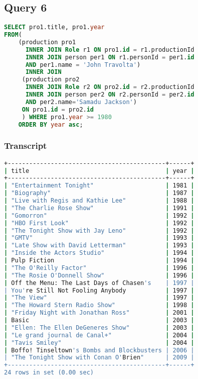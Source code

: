 \subsection{Query 6}
\begin{lstlisting}[language=sql]
SELECT pro1.title, pro1.year
FROM(
	(production pro1
	  INNER JOIN Role r1 ON pro1.id = r1.productionId
	  INNER JOIN person per1 ON r1.personId = per1.id
	  AND per1.name = 'John Travolta')
	  INNER JOIN
	 (production pro2
	  INNER JOIN Role r2 ON pro2.id = r2.productionId
	  INNER JOIN person per2 ON r2.personId = per2.id
	  AND per2.name='Samadu Jackson') 
	 ON pro1.id = pro2.id
	 ) WHERE pro1.year >= 1980
	ORDER BY year asc;
\end{lstlisting}

\subsubsection{Transcript}
\begin{lstlisting}[language=bash]
+--------------------------------------------+------+
| title                                      | year |
+--------------------------------------------+------+
| "Entertainment Tonight"                    | 1981 |
| "Biography"                                | 1987 |
| "Live with Regis and Kathie Lee"           | 1988 |
| "The Charlie Rose Show"                    | 1991 |
| "Gomorron"                                 | 1992 |
| "HBO First Look"                           | 1992 |
| "The Tonight Show with Jay Leno"           | 1992 |
| "GMTV"                                     | 1993 |
| "Late Show with David Letterman"           | 1993 |
| "Inside the Actors Studio"                 | 1994 |
| Pulp Fiction                               | 1994 |
| "The O'Reilly Factor"                      | 1996 |
| "The Rosie O'Donnell Show"                 | 1996 |
| Off the Menu: The Last Days of Chasen's    | 1997 |
| You're Still Not Fooling Anybody           | 1997 |
| "The View"                                 | 1997 |
| "The Howard Stern Radio Show"              | 1998 |
| "Friday Night with Jonathan Ross"          | 2001 |
| Basic                                      | 2003 |
| "Ellen: The Ellen DeGeneres Show"          | 2003 |
| "Le grand journal de Canal+"               | 2004 |
| "Tavis Smiley"                             | 2004 |
| Boffo! Tinseltown's Bombs and Blockbusters | 2006 |
| "The Tonight Show with Conan O'Brien"      | 2009 |
+--------------------------------------------+------+
24 rows in set (0.00 sec)
\end{lstlisting}


